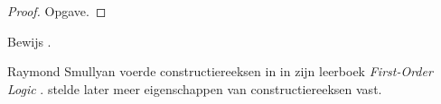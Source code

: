 \documentclass[../../../include/open-logic-section]{subfiles}
\begin{document}
\begin{proof}
Opgave.
\end{proof}

\begin{prob}
Bewijs .
\end{prob}

\begin{history}
Raymond Smullyan voerde constructiereeksen in in zijn leerboek
\emph{First-Order Logic} \citep{Smullyan1968}.
\citet{Zuckerman1973} stelde later meer eigenschappen van
constructiereeksen vast.
\end{history}
\end{document}
